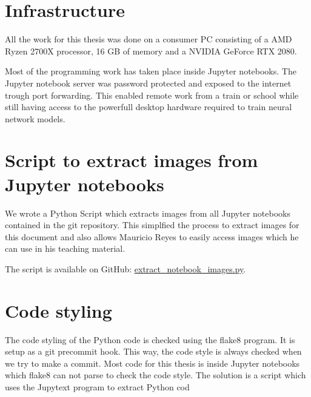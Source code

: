 \section{Infrastructure}
All the work for this thesis was done on a consumer PC consisting of a AMD Ryzen 2700X processor, 16 GB of memory and a NVIDIA GeForce RTX 2080.

Most of the programming work has taken place inside Jupyter notebooks. The Jupyter notebook server was password protected and exposed to the internet trough port forwarding. This enabled remote work from a train or school while still having access to the powerfull desktop hardware required to train neural network models.

\section{Script to extract images from Jupyter notebooks}
We wrote a Python Script which extracts images from all Jupyter notebooks contained in the git repository. This simplfied the process to extract images for this document and also allows Mauricio Reyes to easily access images which he can use in his teaching material.

The script is available on GitHub: \href{https://github.com/andef4/thesis-code/blob/master/extract_notebook_images.py}{extract\_notebook\_images.py}.

\section{Code styling}
The code styling of the Python code is checked using the flake8 program. It is setup as a git precommit hook. This way, the code style is always checked when we try to make a commit. Most code for this thesis is inside Jupyter notebooks which flake8 can not parse to check the code style. The solution is a script which uses the Jupytext \cite{jupytext} program to extract Python cod